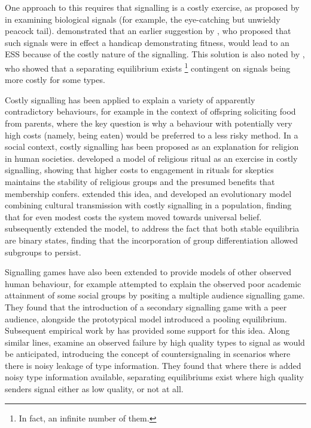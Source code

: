 One approach to this requires that signalling is a costly exercise,
as proposed by \citet{Grafen1990} in examining biological signals
(for example, the eye-catching but unwieldy peacock tail). \citeauthor{Grafen1990}
demonstrated that an earlier suggestion by \citet{Zahavi1975}, who
proposed that such signals were in effect a handicap demonstrating
fitness, would lead to an \ac{ESS} because of the costly nature of
the signalling. This solution is also noted by \citet{Spence1973},
who showed that a separating equilibrium exists%
\footnote{In fact, an infinite number of them.%
} contingent on signals being more costly for some types.

Costly signalling has been applied to explain a variety of apparently
contradictory behaviours, for example \citet{Godfray1991} in the
context of offspring soliciting food from parents, where the key question
is why a behaviour with potentially very high costs (namely, being
eaten) would be preferred to a less risky method. In a social context,
costly signalling has been proposed as an explanation for religion
in human societies. \citet{Sosis2003} developed a model of religious
ritual as an exercise in costly signalling, showing that higher costs
to engagement in rituals for skeptics maintains the stability of religious
groups and the presumed benefits that membership confers. \citet{Henrich2009}
extended this idea, and developed an evolutionary model combining
cultural transmission with costly signalling in a population, finding
that for even modest costs the system moved towards universal belief.
\citet{Wildman2011} subsequently extended the model, to address the
fact that both stable equilibria are binary states, finding that the
incorporation of group differentiation allowed subgroups to persist.

Signalling games have also been extended to provide models of other
observed human behaviour, for example \citet{Austen-Smith2005} attempted
to explain the observed poor academic attainment of some social groups
by positing a multiple audience signalling game. They found that the
introduction of a secondary signalling game with a peer audience,
alongside the prototypical \citeauthor{Spence1973} model introduced
a pooling equilibrium. Subsequent empirical work by \citet{Jr2010}
has provided some support for this idea. Along similar lines, \citet{Feltovich2002}
examine an observed failure by high quality types to signal as would
be anticipated, introducing the concept of countersignaling in scenarios
where there is noisy leakage of type information. They found that
where there is added noisy type information available, separating
equilibriums exist where high quality senders signal either as low
quality, or not at all.


